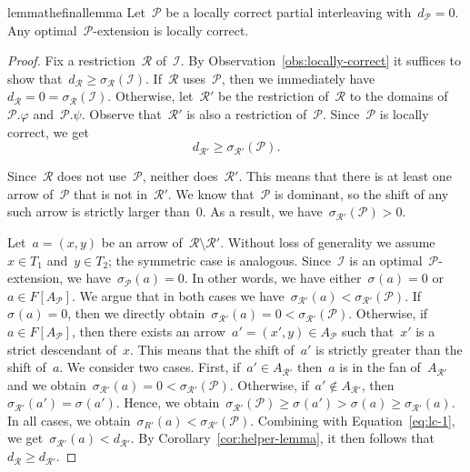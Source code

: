 \documentclass[a4paper,UKenglish, autoref, thm-restate, cleveref]{lipics-v2021}
\newcommand{\shift}[1]{\sigma_{#1}}
\newcommand{\resdist}[1]{d_{#1}}
\renewcommand{\phi}{\varphi}
\newcommand{\I}{\mathcal{I}}
\renewcommand{\P}{\mathcal{P}}
\newcommand{\R}{\mathcal{R}}
\begin{document}
\begin{restatable}{lemma}{thefinallemma}
\label{lem:optimal-extension-locally-correct}
    Let~$\P$ be a locally correct partial interleaving with~$\resdist{\P} = 0$.
    Any optimal~$\P$-extension is locally correct.
\end{restatable}
\begin{proof}
    Fix a restriction~$\R$ of~$\I$.
    By Observation~\ref{obs:locally-correct} it suffices to show that~$\resdist{\R} \ge \shift{\R}(\I)$.
    If~$\R$ uses~$\P$, then we immediately have~$\resdist{\R} = 0 = \shift{\R}(\I)$.
    Otherwise, let~$\R'$ be the restriction of~$\R$ to the domains of~$\P.\phi$ and~$\P.\psi$.
    Observe that~$\R'$ is also a restriction of~$\P$.
    Since~$\P$ is locally correct, we get
    \begin{equation}\label{eq:lc-1}
    \resdist{\R'} \ge \shift{\R'}(\P).
    \end{equation}

    Since~$\R$ does not use~$\P$, neither does~$\R'$.
    This means that there is at least one arrow of~$\P$ that is not in~$\R'$.
    We know that~$\P$ is dominant, so the shift of any such arrow is strictly larger than~$0$.
    As a result, we have~$\shift{\R'}(\P) > 0$.
    
    Let~$a = (x, y)$ be an arrow of~$\R \setminus \R'$.
    Without loss of generality we assume~$x \in T_1$ and~$y \in T_2$; the symmetric case is analogous.
    Since~$\I$ is an optimal~$\P$-extension, we have~$\shift{\P}(a) = 0$.
    In other words, we have either~$\shift{}(a) = 0$ or~$a \in F[A_\P]$.
    We argue that in both cases we have~$\shift{\R'}(a) < \shift{\R'}(\P)$.
    If~$\shift{}(a) = 0$, then we directly obtain~$\shift{\R'}(a) = 0 < \shift{\R'}(\P)$.
    Otherwise, if~$a \in F[A_\P]$, then there exists an arrow~$a' = (x', y) \in A_\P$ such that~$x'$ is a strict descendant of~$x$.
    This means that the shift of~$a'$ is strictly greater than the shift of~$a$.
    We consider two cases.
    First, if~$a' \in A_{\R'}$ then~$a$ is in the fan of~$A_{\R'}$ and we obtain~$\shift{\R'}(a) = 0 < \shift{\R'}(\P)$.
    Otherwise, if~$a' \notin A_{\R'}$, then~$\shift{\R'}(a') = \shift{}(a')$.
    Hence, we obtain~$\shift{\R'}(\P) \ge \shift{}(a') > \shift{}(a) \ge \shift{\R'}(a)$.
    In all cases, we obtain~$\shift{R'}(a) < \shift{\R'}(\P)$.
    Combining with Equation~\eqref{eq:lc-1}, we get~$\shift{\R'}(a) < \resdist{\R'}$.
    By Corollary~\ref{cor:helper-lemma}, it then follows that~$\resdist{\R} \ge \resdist{\R'}$.


\end{proof}
\end{document}
